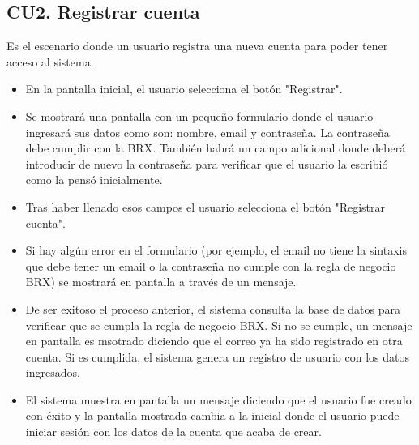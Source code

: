 \subsection{CU2. Registrar cuenta} \par
Es el escenario donde un usuario registra una nueva cuenta para poder tener acceso al sistema.
\begin{itemize}
	\item En la pantalla inicial, el usuario selecciona el botón "Registrar".
	\item Se mostrará una pantalla con un pequeño formulario donde el usuario ingresará sus datos como son: nombre, email y contraseña. La contraseña debe cumplir con la BRX. También habrá un campo adicional donde deberá introducir de nuevo la contraseña para verificar que el usuario la escribió como la pensó inicialmente.
	\item Tras haber llenado esos campos el usuario selecciona el botón "Registrar cuenta".
	\item Si hay algún error en el formulario (por ejemplo, el email no tiene la sintaxis que debe tener un email o la contraseña no cumple con la regla de negocio BRX) se mostrará en pantalla a través de un mensaje.
	\item De ser exitoso el proceso anterior, el sistema consulta la base de datos para verificar que se cumpla la regla de negocio BRX. Si no se cumple, un mensaje en pantalla es msotrado diciendo que el correo ya ha sido registrado en otra cuenta. Si es cumplida, el sistema genera un registro de usuario con los datos ingresados.
	\item El sistema muestra en pantalla un mensaje diciendo que el usuario fue creado con éxito y la pantalla mostrada cambia a la inicial donde el usuario puede iniciar sesión con los datos de la cuenta que acaba de crear.
\end{itemize}
\newpage
